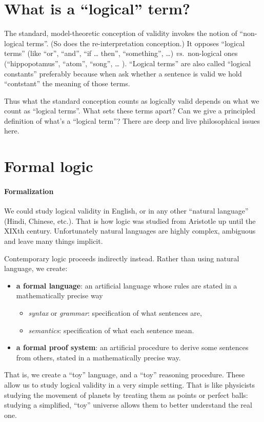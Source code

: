 \documentclass[../../../include/open-logic-part]{subfiles}
\begin{document}
\section{What is a ``logical'' term?}

The standard, model-theoretic conception of validity invokes the
notion of ``non-logical terms''. (So does the re-interpretation
conception.) It opposes ``logical terms'' (like ``or'', ``and'', ``if
\ldots{} then'', ``something'', \ldots ) \emph{vs.}~non-logical ones
(``hippopotamus'', ``atom'', ``song'', \ldots{} ). ``Logical terms''
are also called ``logical constants'' \textemdash{} preferably because
when ask whether a sentence is valid we hold ``contstant'' the meaning
of those terms. 

Thus what the standard conception counts as logically valid depends on
what we count as ``logical terms''. What sets these terms apart? Can
we give a principled definition of what's a ``logical term''? There
are deep and live philosophical issues here. 

\section{Formal logic}

\paragraph{Formalization}

We could study logical validity in English, or in any other ``natural
language'' (Hindi, Chinese, etc.). That is how logic was studied
from Aristotle up until the XIXth century. Unfortunately natural languages
are highly complex, ambiguous and leave many things implicit.

Contemporary logic proceeds indirectly instead. Rather than using
natural language, we create:
\begin{itemize}
\item \textbf{a formal language}: an artificial language whose rules are
stated in a mathematically precise way
\begin{itemize}
\item \emph{syntax} or \emph{grammar}: specification of what sentences are,
\item \emph{semantics}: specification of what each sentence mean.
\end{itemize}
\item \textbf{a formal proof system}: an artificial procedure to derive
some sentences from others, stated in a mathematically precise way.
\end{itemize}
That is, we create a ``toy'' language, and a ``toy'' reasoning
procedure. These allow us to study logical validity in a very simple
setting. That is like physicists studying the movement of planets
by treating them as points or perfect balls: studying a simplified,
``toy'' universe allows them to better understand the real one. 
\end{document}
